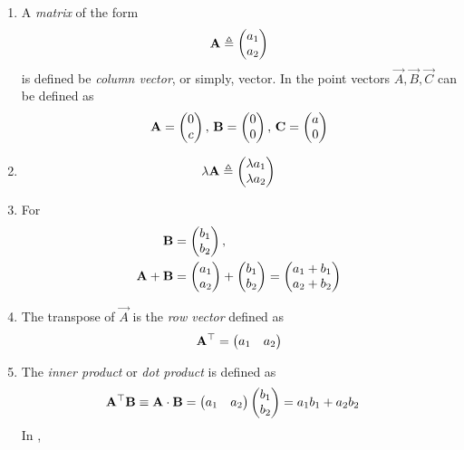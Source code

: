 \begin{enumerate}[label=\thesection.\arabic*.,ref=\thesection.\theenumi]
	\item A {\em matrix} of the form 
\begin{align}
  \mathbf{A} \triangleq  \begin{pmatrix}a_1\\a_2\end{pmatrix} 
\end{align}
		is defined be  {\em column vector}, or simply, vector.
	In 
		the point vectors $\vec{A}, \vec{B}, \vec{C}$ can be defined as
\begin{align}
\mathbf{A} = \begin{pmatrix}0 \\ c\end{pmatrix},\,
\mathbf{B} = \begin{pmatrix}0 \\ 0\end{pmatrix},\,
\mathbf{C} = \begin{pmatrix}a \\ 0\end{pmatrix}
\end{align}
\item 
\begin{align}
  \lambda\mathbf{A} \triangleq  \begin{pmatrix}\lambda a_1\\ \lambda a_2\end{pmatrix} 
\end{align}
\item For 
\begin{align}
	\mathbf{B} &= 	\begin{pmatrix}b_1 \\ b_2\end{pmatrix},
	\\
	\mathbf{A}+ 
	\mathbf{B} &= \begin{pmatrix}a_1 \\ a_2\end{pmatrix}+	\begin{pmatrix}b_1 \\ b_2\end{pmatrix} = 
	 \begin{pmatrix}a_1 +b_1 \\ a_2 +b_2\end{pmatrix} 
\end{align}
  \item  The transpose of $\vec{A}$ is the {\em row vector} defined as
\begin{align}
  \label{eq:transpose2d}
  \vec{A}^{\top}  = \myvec{a_1 & a_2}
\end{align}
%
\item The {\em inner product} or {\em dot product} is defined as
  \label{prop:dot2d}
\begin{align}
  \label{eq:dot2d}
  \vec{A}^{\top} \vec{B} &\equiv \vec{A} \cdot \vec{B} 
  = \myvec{a_1 & a_2} \myvec{b_1 \\ b_2}= a_1b_1+a_2b_2 
\end{align}
%
	In 
,	
\begin{align}

\end{align}
\end{enumerate}
